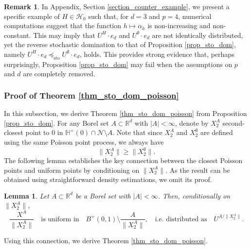 \documentclass[a4paper, 11pt]{article}
\theoremstyle{plain}
\newtheorem{Lemma}[Theorem]{Lemma}
\theoremstyle{definition}
\newtheorem{Remark}[Theorem]{Remark}
\newcommand{\R}{\mathbb{R}}
\numberwithin{equation}{section}
\begin{document}
\begin{Remark}
    \label{remark_fail}
    In Appendix, Section \ref{section_counter_example}, we present a specific example of $H \in \mathcal H_0$ such that, for $d=3$ and $p=4$, numerical computations suggest that the function $h\mapsto\alpha_h$ is non-increasing and non-constant. This may imply that $U^H \cdot e_d$ and $U^\emptyset \cdot e_d$ are not identically distributed, yet the reverse stochastic domination to that of Proposition \ref{prop_sto_dom}, namely $U^H \cdot e_d \preceq_{\mathrm{sto}}U^\emptyset \cdot e_d$, holds. This provides strong evidence that, perhaps surprisingly, Proposition \ref{prop_sto_dom} may fail when the assumptions on $p$ and $d$ are completely removed.
\end{Remark}


\subsubsection{Proof of Theorem \ref{thm_sto_dom_poisson}}

\label{section_proof_sto_dom}

In this subsection, we derive Theorem \ref{thm_sto_dom_poisson} from Proposition \ref{prop_sto_dom}. For any Borel set $A\subset\R^d$ with $|A|<\infty$, denote by $X_2^A$ second-closest point to $0$ in $\mathbb H^+(0)\cap \mathcal N\setminus A$. Note that since $X^A_2$ and $X^\emptyset_2$ are defined using the same Poisson point process, we always have
\begin{equation}
    \label{eq_ineq_r2}
    \|X_2^A\|\geq\|X_2^\emptyset\|.
\end{equation}
The following lemma establishes the key connection between the closest Poisson points and uniform points by conditioning on $\|X_2^A\|$. As the result can be obtained using straightforward density estimations, we omit its proof.


\begin{Lemma}
    \label{lemma_uniformisation}
    Let $A\subset\R^d$ be a Borel set with $|A|<\infty$. Then, conditionally on $\|X_2^A\|$,
        \[\frac{X^A}{\|X_2^A\|}\quad\text{is uniform in}\quad B^+(0,1)\setminus \frac{A}{\|X_2^A\|},\quad \text{i.e.\ distributed as}\quad U^{A/\|X_2^A\|}.\]
\end{Lemma}


Using this connection, we derive Theorem \ref{thm_sto_dom_poisson}.
\end{document}
